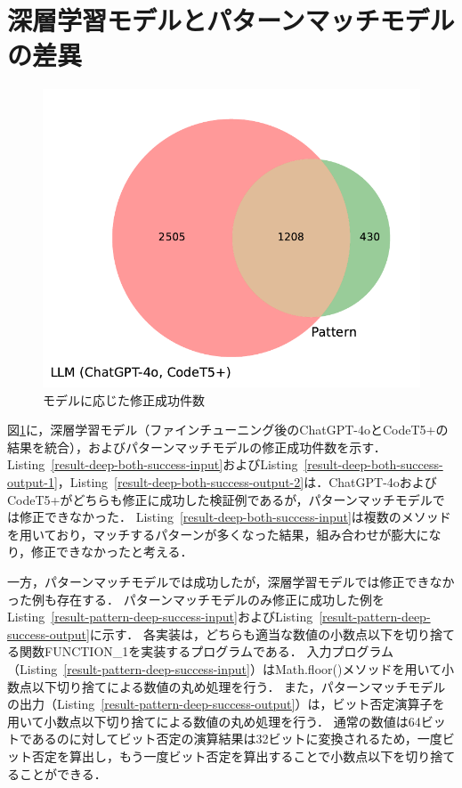 \documentclass[11pt]{jreport}
\newcommand{\fix}[1]{#1}
\begin{document}




\section{深層学習モデルとパターンマッチモデルの差異}


\begin{figure}[t]
\begin{center}
\includegraphics[width=0.5\linewidth]{Omori_fig/figure-venn3_2.pdf}
\caption{\fix{モデルに応じた修正成功件数}}
\label{fig:eval-1:result-fast-venn3}
\end{center}
\end{figure}


\fix{図\ref{fig:eval-1:result-fast-venn3}に，深層学習モデル（ファインチューニング後のChatGPT-4oとCodeT5+の結果を統合），およびパターンマッチモデルの修正成功件数を示す．}
Listing~\ref{result-deep-both-success-input}およびListing~\ref{result-deep-both-success-output-1}，Listing~\ref{result-deep-both-success-output-2}は．ChatGPT-4oおよびCodeT5+がどちらも修正に成功した検証例であるが，パターンマッチモデルでは修正できなかった．
Listing~\ref{result-deep-both-success-input}は複数のメソッドを用いており，マッチするパターンが多くなった結果，組み合わせが膨大になり，修正できなかったと考える．

一方，パターンマッチモデルでは成功したが，深層学習モデルでは修正できなかった例も存在する．
パターンマッチモデルのみ修正に成功した例をListing~\ref{result-pattern-deep-success-input}およびListing~\ref{result-pattern-deep-success-output}に示す．
各実装は，どちらも適当な数値の小数点以下を切り捨てる関数FUNCTION\_1を実装するプログラムである．
入力プログラム（Listing~\ref{result-pattern-deep-success-input}）はMath.floor()メソッドを用いて小数点以下切り捨てによる数値の丸め処理を行う．
また，パターンマッチモデルの出力（Listing~\ref{result-pattern-deep-success-output}）は，ビット否定演算子を用いて小数点以下切り捨てによる数値の丸め処理を行う．
通常の数値は64ビットであるのに対してビット否定の演算結果は32ビットに変換されるため，一度ビット否定を算出し，もう一度ビット否定を算出することで小数点以下を切り捨てることができる．
\end{document}
